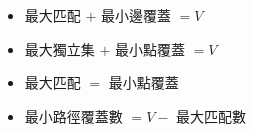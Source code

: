\begin{itemize}
	\item 最大匹配 $+$ 最小邊覆蓋 $= V$
	\item 最大獨立集 $+$ 最小點覆蓋 $= V$
	\item 最大匹配 $=$ 最小點覆蓋
	\item 最小路徑覆蓋數 $= V -$ 最大匹配數
\end{itemize}